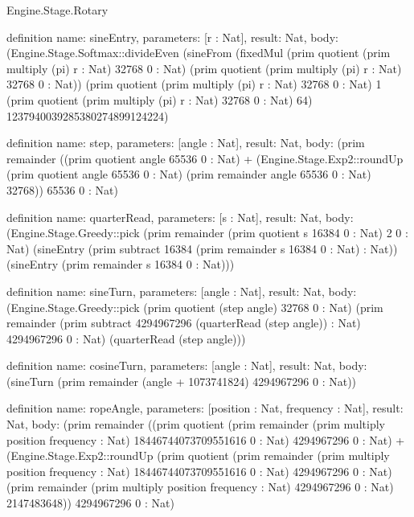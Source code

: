 \begin{lexlean}{Engine.Stage.Rotary}
\begin{semanticmodule}
definition{
  name: sineEntry,
  parameters: [r : Nat],
  result: Nat,
  body: (Engine.Stage.Softmax::divideEven (sineFrom (fixedMul (prim quotient (prim multiply (pi) r : Nat) 32768 0 : Nat) (prim quotient (prim multiply (pi) r : Nat) 32768 0 : Nat)) (prim quotient (prim multiply (pi) r : Nat) 32768 0 : Nat) 1 (prim quotient (prim multiply (pi) r : Nat) 32768 0 : Nat) 64) 1237940039285380274899124224)
}

definition{
  name: step,
  parameters: [angle : Nat],
  result: Nat,
  body: (prim remainder ((prim quotient angle 65536 0 : Nat) + (Engine.Stage.Exp2::roundUp (prim quotient angle 65536 0 : Nat) (prim remainder angle 65536 0 : Nat) 32768)) 65536 0 : Nat)
}

definition{
  name: quarterRead,
  parameters: [s : Nat],
  result: Nat,
  body: (Engine.Stage.Greedy::pick (prim remainder (prim quotient s 16384 0 : Nat) 2 0 : Nat) (sineEntry (prim subtract 16384 (prim remainder s 16384 0 : Nat) : Nat)) (sineEntry (prim remainder s 16384 0 : Nat)))
}

definition{
  name: sineTurn,
  parameters: [angle : Nat],
  result: Nat,
  body: (Engine.Stage.Greedy::pick (prim quotient (step angle) 32768 0 : Nat) (prim remainder (prim subtract 4294967296 (quarterRead (step angle)) : Nat) 4294967296 0 : Nat) (quarterRead (step angle)))
}

definition{
  name: cosineTurn,
  parameters: [angle : Nat],
  result: Nat,
  body: (sineTurn (prim remainder (angle + 1073741824) 4294967296 0 : Nat))
}

definition{
  name: ropeAngle,
  parameters: [position : Nat, frequency : Nat],
  result: Nat,
  body: (prim remainder ((prim quotient (prim remainder (prim multiply position frequency : Nat) 18446744073709551616 0 : Nat) 4294967296 0 : Nat) + (Engine.Stage.Exp2::roundUp (prim quotient (prim remainder (prim multiply position frequency : Nat) 18446744073709551616 0 : Nat) 4294967296 0 : Nat) (prim remainder (prim multiply position frequency : Nat) 4294967296 0 : Nat) 2147483648)) 4294967296 0 : Nat)
}
\end{semanticmodule}
\end{lexlean}
